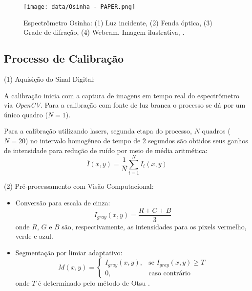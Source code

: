 \documentclass[a4paper]{ifacconf}
\begin{document}
\begin{figure}[ht]
\centering
\texttt{[image: data/Osinha - PAPER.png]}
\caption{Espectrômetro Osinha: (1) Luz incidente, (2) Fenda óptica, (3) Grade de difração, (4) Webcam. Imagem ilustrativa, \cite{gaudi_spectrometer}.}
\label{fig:osinha}
\end{figure}

\subsection{Processo de Calibração}
\label{subsec:calibracao}

(1) Aquisição do Sinal Digital:

A calibração inicia com a captura de imagens em tempo real do espectrômetro via \textit{OpenCV}. Para a calibração com fonte de luz branca o processo se dá por um único quadro ($N=1$).

Para a calibração utilizando lasers, segunda etapa do processo, $N$ quadros ($N=20$) no intervalo homogêneo de tempo de 2 segundos são obtidos seus ganhos de intensidade para redução de ruído por meio de média aritmética:
\begin{equation}
    \bar{I}(x,y) = \frac{1}{N}\sum_{i=1}^{N} I_i(x,y)
    \label{eq:frame_avg}
\end{equation}

(2) Pré-processamento com Visão Computacional:

\begin{itemize}
    \item Conversão para escala de cinza:
    \begin{equation}
        I_{gray}(x,y) = \frac{R + G + B}{3}
    \end{equation}
    onde $R$, $G$ e $B$ são, respectivamente, as intensidades para os pixels vermelho, verde e azul.
    
    \item Segmentação por limiar adaptativo:
    \begin{equation}
        M(x,y) = \begin{cases}
            I_{gray}(x,y), & \text{se } I_{gray}(x,y) \geq T \\
            0, & \text{caso contrário}
        \end{cases}
        \label{eq:threshold}
    \end{equation}
    onde $T$ é determinado pelo método de Otsu \cite{otsu1979}.
\end{itemize}
\end{document}

